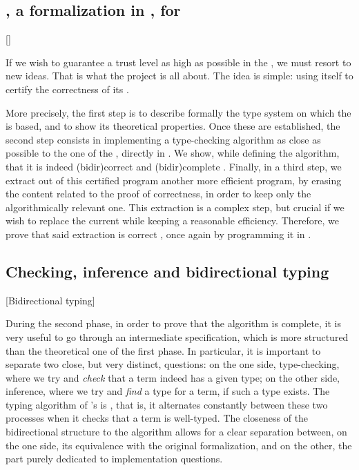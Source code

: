 \subsection{, a formalization in , for }[]

If we wish to guarantee a trust level as high as possible in the , we must
resort to new ideas. That is what the  project is all about. The idea
is simple: using  itself to certify the correctness of its .

More precisely, the first step is to describe formally the type system on which the 
is based, and to show its theoretical properties.
Once these are established, the second step
consists in implementing a type-checking algorithm as close as possible to the one of the
, directly in %
.
We show, while defining the algorithm, that it is indeed \reintro(bidir){correct}%
and \reintro(bidir){complete}%
.
Finally, in a third step, we extract out of this certified  program another
more efficient program, by erasing the content related to the proof of correctness, in order
to keep only the algorithmically relevant one.
This extraction is a complex step, but crucial if we wish to replace the current 
while keeping a reasonable efficiency. Therefore, we prove that said extraction
is correct%
,
once again by programming it in .

\subsection{Checking, inference and bidirectional typing}[Bidirectional typing]

During the second phase, in order to prove that the algorithm is complete, it is
very useful to go through an intermediate specification, which is more structured
than the theoretical one of the first phase.
In particular, it is important to separate two close, but very distinct, questions:
on the one side, type-checking, where we try and \emph{check} that a term indeed has a
given type;
on the other side, inference, where we try and \emph{find} a type for a term, if such a
type exists.
The typing algorithm of 's  is , that is, it
alternates constantly between these two processes when it checks that a term is well-typed.
The closeness of the bidirectional structure to the algorithm allows for a
clear separation between, on the one side, its equivalence with the original formalization,
and on the other, the part purely dedicated to implementation questions.

